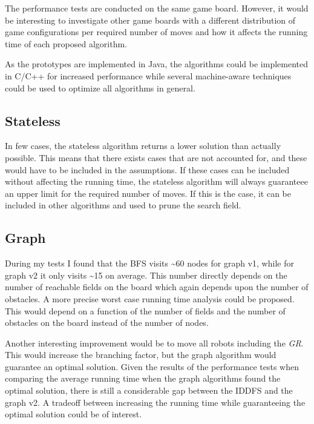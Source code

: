 \documentclass[]{article}
\begin{document}
The performance tests are conducted on the same game board. However, it
would be interesting to investigate other game boards with a different
distribution of game configurations per required number of moves and how
it affects the running time of each proposed algorithm.

As the prototypes are implemented in Java, the algorithms could be
implemented in C/C++ for increased performance while several
machine-aware techniques could be used to optimize all algorithms in
general.

\subsection{Stateless}\label{stateless-1}

In few cases, the stateless algorithm returns a lower solution than
actually possible. This means that there exists cases that are not
accounted for, and these would have to be included in the assumptions.
If these cases can be included without affecting the running time, the
stateless algorithm will always guaranteee an upper limit for the
required number of moves. If this is the case, it can be included in
other algorithms and used to prune the search field.

\subsection{Graph}\label{graph}

During my tests I found that the BFS visits \textasciitilde{}60 nodes
for graph v1, while for graph v2 it only visits \textasciitilde{}15 on
average. This number directly depends on the number of reachable fields
on the board which again depends upon the number of obstacles. A more
precise worst case running time analysis could be proposed. This would
depend on a function of the number of fields and the number of obstacles
on the board instead of the number of nodes.

Another interesting improvement would be to move all robots including
the \emph{GR}. This would increase the branching factor, but the graph
algorithm would guarantee an optimal solution. Given the results of the
performance tests when comparing the average running time when the graph
algorithms found the optimal solution, there is still a considerable gap
between the IDDFS and the graph v2. A tradeoff between increasing the
running time while guaranteeing the optimal solution could be of
interest.
\end{document}
